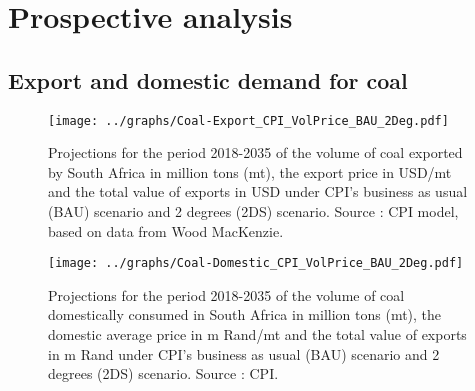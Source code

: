 \documentclass[12pt,english]{article}
\begin{document}
\section{Prospective analysis}\label{prospective}

\subsection{Export and domestic demand for coal}



\begin{figure}[!t]
	\centering
	\texttt{[image: ../graphs/Coal-Export\_CPI\_VolPrice\_BAU\_2Deg.pdf]}
	\caption{\label{Coal-Export_CPI_VolPrice_BAU_2DS}\small Projections for the period 2018-2035 of the volume of coal exported by South Africa in million tons (mt), the export price in USD/mt and the total value of exports in USD under CPI's business as usual (BAU) scenario and 2 degrees (2DS) scenario. Source : CPI model, based on data from Wood MacKenzie.}
\end{figure}

\begin{figure}[!t]
	\centering
	\texttt{[image: ../graphs/Coal-Domestic\_CPI\_VolPrice\_BAU\_2Deg.pdf]}
	\caption{\label{Coal-Domestic_CPI_VolPrice_BAU_2DS}\small Projections for the period 2018-2035 of the volume of coal domestically consumed in South Africa in million tons (mt), the domestic average price in m Rand/mt and the total value of exports in m Rand under CPI's business as usual (BAU) scenario and 2 degrees (2DS) scenario. Source : CPI.}
\end{figure}
\end{document}
